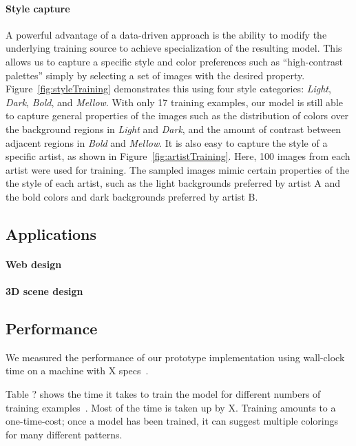 \paragraph{Style capture} A powerful advantage of a data-driven approach is the ability to modify the underlying training source to achieve specialization of the resulting model. This allows us to capture a specific style and color preferences such as ``high-contrast palettes'' simply by selecting a set of images with the desired property. Figure~\ref{fig:styleTraining} demonstrates this using four style categories: \emph{Light}, \emph{Dark}, \emph{Bold}, and \emph{Mellow}. With only 17 training examples, our model is still able to capture general properties of the images such as the distribution of colors over the background regions in \emph{Light} and \emph{Dark}, and the amount of contrast between adjacent regions in \emph{Bold} and \emph{Mellow}. It is also easy to capture the style of a specific artist, as shown in Figure~\ref{fig:artistTraining}. Here, 100 images from each artist were used for training. The sampled images mimic certain properties of the the style of each artist, such as the light backgrounds preferred by artist A and the bold colors and dark backgrounds preferred by artist B.

\subsection{Applications}

\paragraph{Web design}

\paragraph{3D scene design}

\subsection{Performance}

We measured the performance of our prototype implementation using wall-clock time on a machine with X specs~.

Table ? shows the time it takes to train the model for different numbers of training examples~. Most of the time is taken up by X. Training amounts to a one-time-cost; once a model has been trained, it can suggest multiple colorings for many different patterns.

